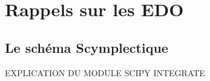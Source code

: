 

\chapter{Rappels sur les EDO} %
\label{AppendixA}

\section{Le schéma Scymplectique}



EXPLICATION DU MODULE SCIPY INTEGRATE